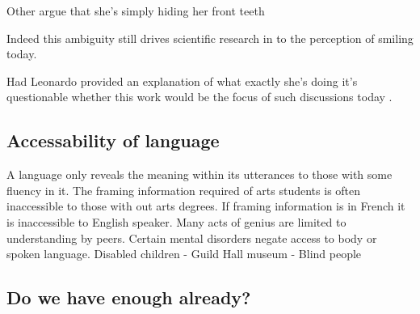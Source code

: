 \documentclass[11pt]{article}
\begin{document}
Other argue that she's simply hiding her front teeth \cite{Borkowski1992}

Indeed this ambiguity still drives scientific research in to the perception of smiling today.

Had Leonardo provided an explanation of what exactly she's doing it's questionable whether this work would be the focus of such discussions today \cite{Kontsevich2004}.

\subsection{Accessability of language}
\label{sec:orgd5fc2dd}

A language only reveals the meaning within its utterances to those with some fluency in it. 
The framing information required of arts students is often inaccessible to those with out arts degrees.
If framing information is in French it is inaccessible to English speaker.
Many acts of genius are limited to understanding by peers.
Certain mental disorders negate access to body or spoken language.
Disabled children - Guild Hall museum - Blind people

\subsection{Do we have enough already?}
\label{sec:org200c174}
\end{document}
